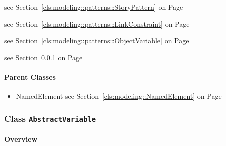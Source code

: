 \begin{description}
\begin{description}
	
\item[pattern : StoryPattern 	]
see Section~\ref{cls:modeling::patterns::StoryPattern} on Page~\pageref{cls:modeling::patterns::StoryPattern}\hspace{\fill}
\nopagebreak


	
\item[secondLinkConstraint : LinkConstraint 			\symbol{"5B}0..$*$\symbol{"5D}]
see Section~\ref{cls:modeling::patterns::LinkConstraint} on Page~\pageref{cls:modeling::patterns::LinkConstraint}\hspace{\fill}
\nopagebreak


	
\item[source : ObjectVariable 	]
see Section~\ref{cls:modeling::patterns::ObjectVariable} on Page~\pageref{cls:modeling::patterns::ObjectVariable}\hspace{\fill}
\nopagebreak


	
\item[target : AbstractVariable 	]
see Section~\ref{cls:modeling::patterns::AbstractVariable} on Page~\pageref{cls:modeling::patterns::AbstractVariable}\hspace{\fill}
\nopagebreak


	
	\end{description}
	

\end{description}

\paragraph{Parent Classes}
\begin{itemize}
\item NamedElement see Section~\ref{cls:modeling::NamedElement} on Page~\pageref{cls:modeling::NamedElement}\end{itemize}
\subsubsection{\Large{Class \bfseries \texttt{AbstractVariable}\normalfont}}
\label{cls:modeling::patterns::AbstractVariable} 
\paragraph{Overview}

